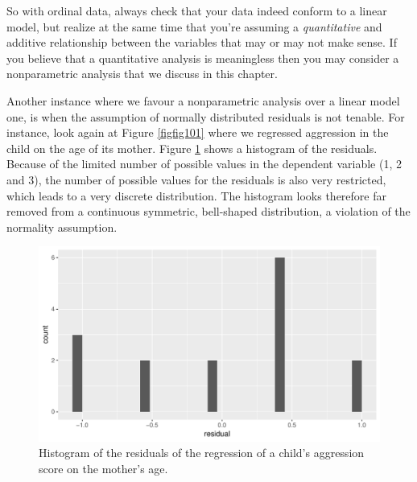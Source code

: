 \documentclass[]{report}\usepackage[]{graphicx}\usepackage[]{color}
\makeatletter
\def\maxwidth{ %
  \ifdim\Gin@nat@width>\linewidth
    \linewidth
  \else
    \Gin@nat@width
  \fi
}
\newenvironment{knitrout}{}{} %
\makeatother
\begin{document}
So with ordinal data, always check that your data indeed conform to a linear model, but realize at the same time that you're assuming a \textit{quantitative} and additive relationship between the variables that may or may not make sense. If you believe that a quantitative analysis is meaningless then you may consider a nonparametric analysis that we discuss in this chapter. 

Another instance where we favour a nonparametric analysis over a linear model one, is when the assumption of normally distributed residuals is not tenable. For instance, look again at Figure \ref{figfig101} where we regressed aggression in the child on the age of its mother. Figure \ref{fig:fig1201} shows a histogram of the residuals. Because of the limited number of possible values in the dependent variable (1, 2 and 3), the number of possible values for the residuals is also very restricted, which leads to a very discrete distribution. The histogram looks therefore far removed from a continuous symmetric, bell-shaped distribution, a violation of the normality assumption. 

\begin{knitrout}
\color{fgcolor}\begin{figure}

{\centering \includegraphics[width=\maxwidth]{figure/fig1201-1} 

}

\caption[Histogram of the residuals of the regression of a child's aggression score on the mother's age]{Histogram of the residuals of the regression of a child's aggression score on the mother's age.}\label{fig:fig1201}
\end{figure}


\end{knitrout}
\end{document}
